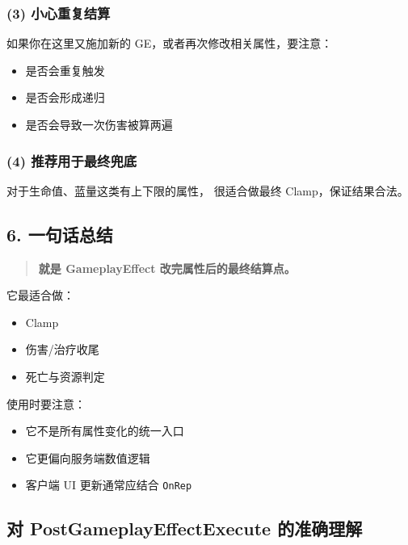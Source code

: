 \documentclass[10pt,CJKmath]{ctexart}
\begin{document}
\subsubsection{(3) 小心重复结算}

如果你在这里又施加新的 GE，或者再次修改相关属性，要注意：

\begin{itemize}
	\item 是否会重复触发
	\item 是否会形成递归
	\item 是否会导致一次伤害被算两遍
\end{itemize}

\subsubsection{(4) 推荐用于最终兜底}

对于生命值、蓝量这类有上下限的属性，  
 很适合做最终 Clamp，保证结果合法。

\subsection{6. 一句话总结}

\begin{quote}
	\textbf{ 就是 GameplayEffect 改完属性后的最终结算点。}
\end{quote}

它最适合做：

\begin{itemize}
	\item Clamp
	\item 伤害/治疗收尾
	\item 死亡与资源判定
\end{itemize}

使用时要注意：

\begin{itemize}
	\item 它不是所有属性变化的统一入口
	\item 它更偏向服务端数值逻辑
	\item 客户端 UI 更新通常应结合 \verb|OnRep|
\end{itemize}

\subsection{对 PostGameplayEffectExecute 的准确理解}
\end{document}
